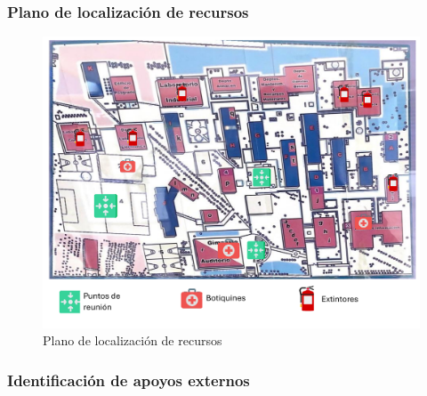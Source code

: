 \subsubsection{Plano de localización de recursos}

% 
\begin{figure}[H]
    \centering
    \includegraphics[scale=0.25]{13/img/localizacionDeRecursos.pdf}
    \caption{Plano de localización de recursos}
\end{figure}
% 
% 
% 
\subsubsection{ Identificación de apoyos externos}

